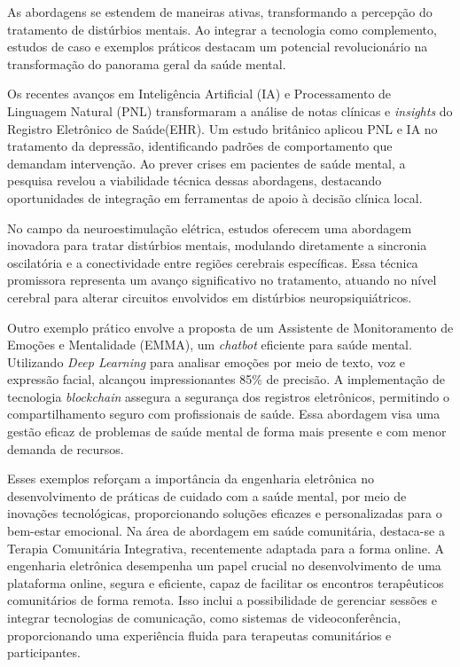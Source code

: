         As abordagens se estendem de maneiras ativas, transformando a percepção do tratamento de distúrbios mentais. Ao integrar a tecnologia como complemento, estudos de caso e exemplos práticos destacam um potencial revolucionário na transformação do panorama geral da saúde mental.
        
        Os recentes avanços em Inteligência Artificial (IA) e Processamento de Linguagem Natural (PNL) transformaram a análise de notas clínicas e \textit{insights} do Registro Eletrônico de Saúde(EHR). Um estudo britânico aplicou PNL e IA no tratamento da depressão, identificando padrões de comportamento que demandam intervenção. Ao prever crises em pacientes de saúde mental, a pesquisa revelou a viabilidade técnica dessas abordagens, destacando oportunidades de integração em ferramentas de apoio à decisão clínica local\cite{MSOSA}.
        
        No campo da neuroestimulação elétrica, estudos oferecem uma abordagem inovadora para tratar distúrbios mentais, modulando diretamente a sincronia oscilatória e a conectividade entre regiões cerebrais específicas. Essa técnica promissora representa um avanço significativo no tratamento, atuando no nível cerebral para alterar circuitos envolvidos em distúrbios neuropsiquiátricos\cite{LO}.
        
        Outro exemplo prático envolve a proposta de um Assistente de Monitoramento de Emoções e Mentalidade (EMMA), um \textit{chatbot} eficiente para saúde mental. Utilizando \textit{Deep Learning} para analisar emoções por meio de texto, voz e expressão facial, alcançou impressionantes 85\% de precisão. A implementação de tecnologia \textit{blockchain} assegura a segurança dos registros eletrônicos, permitindo o compartilhamento seguro com profissionais de saúde. Essa abordagem visa uma gestão eficaz de problemas de saúde mental de forma mais presente e com menor demanda de recursos\cite{EMMA}.
        
        Esses exemplos reforçam a importância da engenharia eletrônica no desenvolvimento de práticas de cuidado com a saúde mental, por meio de inovações tecnológicas, proporcionando soluções eficazes e personalizadas para o bem-estar emocional. Na área de abordagem em saúde comunitária, destaca-se a Terapia Comunitária Integrativa, recentemente adaptada para a forma online\cite{SILVAFRANCO}. A engenharia eletrônica desempenha um papel crucial no desenvolvimento de uma plataforma online, segura e eficiente, capaz de facilitar os encontros terapêuticos comunitários de forma remota. Isso inclui a possibilidade de gerenciar sessões e integrar tecnologias de comunicação, como sistemas de videoconferência, proporcionando uma experiência fluida para terapeutas comunitários e participantes.
        
